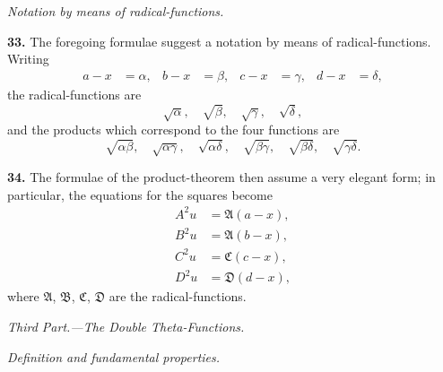 \documentclass[11pt,a4paper]{book}
\begin{document}
\vspace{1em}

\begin{center}
\textit{Notation by means of radical-functions.}
\end{center}

\vspace{0.5em}

\noindent\textbf{33.}\quad
The foregoing formulae suggest a notation by means of radical-functions. Writing
\begin{align*}
a - x &= \alpha, & b - x &= \beta, & c - x &= \gamma, & d - x &= \delta,
\end{align*}
the radical-functions are
\[
\sqrt{\alpha},\quad \sqrt{\beta},\quad \sqrt{\gamma},\quad \sqrt{\delta},
\]
and the products which correspond to the four functions are
\[
\sqrt{\alpha\beta},\quad \sqrt{\alpha\gamma},\quad \sqrt{\alpha\delta},\quad \sqrt{\beta\gamma},\quad \sqrt{\beta\delta},\quad \sqrt{\gamma\delta}.
\]

\noindent\textbf{34.}\quad
The formulae of the product-theorem then assume a very elegant form; in particular, the equations for the squares become
\begin{align*}
A^2 u &= \mathfrak{A}(a - x), \\
B^2 u &= \mathfrak{A}(b - x), \\
C^2 u &= \mathfrak{C}(c - x), \\
D^2 u &= \mathfrak{D}(d - x),
\end{align*}
where $\mathfrak{A}$, $\mathfrak{B}$, $\mathfrak{C}$, $\mathfrak{D}$ are the radical-functions.

\vspace{1em}

\begin{center}
\textit{Third Part.---The Double Theta-Functions.}
\end{center}

\vspace{0.5em}

\begin{center}
\textit{Definition and fundamental properties.}
\end{center}

\vspace{0.5em}
\end{document}

